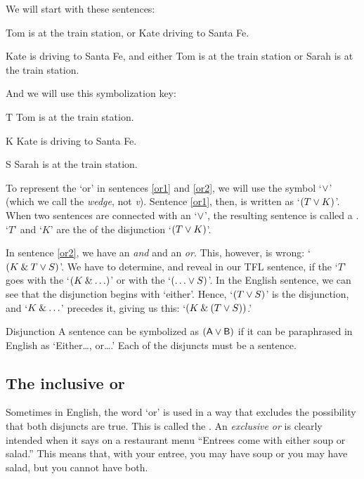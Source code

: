 We will start with these sentences:
	\begin{earg}
		\item[\ex{or1}] Tom is at the train station, or Kate driving to Santa Fe.
		\item[\ex{or2}] Kate is driving to Santa Fe, and either Tom is at the train station or Sarah is at the train station. 
	\end{earg}
And we will use this symbolization key:
	\begin{ekey}
		\item[T] Tom is at the train station.
		\item[K] Kate is driving to Santa Fe.
		\item[S] Sarah is at the train station.
	\end{ekey}
To represent the `or' in sentences \ref{or1} and \ref{or2}, we will use the symbol `$\vee$' (which we call the \textit{wedge}, not \textit{v}). Sentence \ref{or1}, then, is written as `$(T \vee K)$'. When two sentences are connected with an `$\vee$', the resulting sentence is called a . `$T$' and `$K$' are the  of the disjunction `$(T \vee K)$'.

In sentence \ref{or2}, we have an \textit{and} and an \textit{or}. This, however, is wrong: `$(K \mathbin{\&} T \vee S)$'. We have to determine, and reveal in our TFL sentence, if the `$T$' goes with the `$(K \mathbin{\&} \ldots)$' or with the `$(\dots \eor S)$'. In the English sentence, we can see that the disjunction begins with `either'. Hence, `$(T \vee S)$' is the disjunction, and `$K \mathbin{\&} \ldots$' precedes it, giving us this: `$(K \mathbin{\&} (T \vee S))$.'


\begin{factboxy}{Disjunction}
A sentence can be symbolized as $(\mathsf{A}\vee\mathsf{B})$ if it can be paraphrased in English as `Either\ldots, or\ldots.' Each of the disjuncts must be a sentence.
\end{factboxy}

\subsection{The inclusive or}\label{inclusive-or-1}

Sometimes in English, the word `or' is used in a way that excludes the possibility that both disjuncts are true. This is called the .  An \emph{exclusive or} is clearly intended when it says on a restaurant menu ``Entrees come with either soup or salad.'' This means that, with your entree, you may have soup or you may have salad, but you cannot have both.

